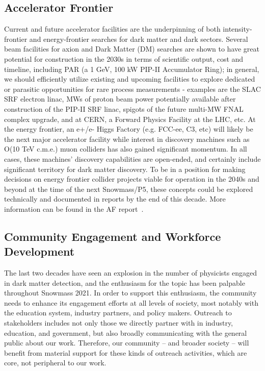 \documentclass[nofootinbib]{article}
\begin{document}
\subsection{Accelerator Frontier}
Current and future accelerator facilities are the underpinning of both intensity-frontier and energy-frontier searches for dark matter and dark sectors. Several beam facilities for axion and Dark Matter (DM) searches are shown to have great potential for construction in the 2030s in terms of scientific output, cost and timeline, including PAR (a 1 GeV, 100 kW PIP-II Accumulator Ring); in general, we should efficiently utilize existing and upcoming facilities to explore dedicated or parasitic opportunities for rare process measurements - examples are the SLAC SRF electron linac, MWs of proton beam power potentially available after construction of the PIP-II SRF linac, spigots of the future multi-MW FNAL complex upgrade, and at CERN, a Forward Physics Facility at the LHC, etc.  At the energy frontier, an e+/e- Higgs Factory (e.g. FCC-ee, C3, etc) will likely be the next major accelerator facility while interest in discovery machines such as O(10 TeV c.m.e.) muon colliders has also gained significant momentum. In all cases, these machines’ discovery capabilities are open-ended, and certainly include significant territory for dark matter discovery. To be in a position for making decisions on energy frontier collider projects viable for operation in the 2040s and beyond at the time of the next Snowmass/P5, these concepts could be explored technically and documented in reports by the end of this decade.  More information can be found in the AF report~\cite{AF-Report}.



\subsection{Community Engagement and Workforce Development}

The last two decades have seen an explosion in the number of physicists engaged in dark matter detection, and the enthusiasm for the topic has been palpable throughout Snowmass 2021. In order to support this enthusiasm, the community needs to enhance its engagement efforts at all levels of society, most notably with the education system, industry partners, and policy makers. Outreach to stakeholders includes not only those we directly partner with in industry, education, and government, but also broadly communicating with the general public about our work. Therefore, our community -- and broader society -- will benefit from material support for these kinds of outreach activities, which are core, not peripheral to our work. 
\end{document}
